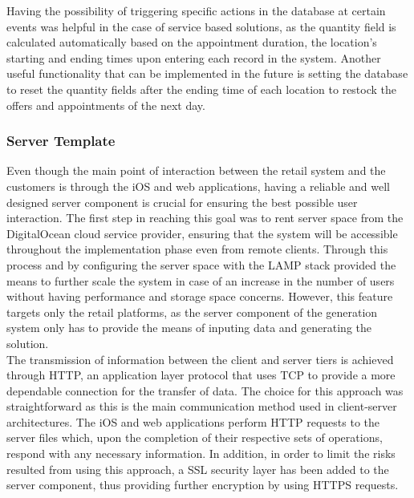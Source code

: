 Having the possibility of triggering specific actions in the database at certain events was helpful in the case of service based solutions, as the quantity field is calculated automatically based on the appointment duration, the location's starting and ending times upon entering each record in the system. Another useful functionality that can be implemented in the future is setting the database to reset the quantity fields after the ending time of each location to restock the offers and appointments of the next day.\\

\subsubsection{Server Template}

Even though the main point of interaction between the retail system and the customers is through the iOS and web applications, having a reliable and well designed server component is crucial for ensuring the best possible user interaction. The first step in reaching this goal was to rent server space from the DigitalOcean cloud service provider, ensuring that the system will be accessible throughout the implementation phase even from remote clients. Through this process and by configuring the server space with the LAMP stack provided the means to further scale the system in case of an increase in the number of users without having performance and storage space concerns. However, this feature targets only the retail platforms, as the server component of the generation system only has to provide the means of inputing data and generating the solution.\\

The transmission of information between the client and server tiers is achieved through HTTP, an application layer protocol that uses TCP to provide a more dependable connection for the transfer of data. The choice for this approach was straightforward as this is the main communication method used in client-server architectures. The iOS and web applications perform HTTP requests to the server files which, upon the completion of their respective sets of operations, respond with any necessary information. In addition, in order to limit the risks resulted from using this approach, a SSL security layer has been added to the server component, thus providing further encryption by using HTTPS requests.\\

